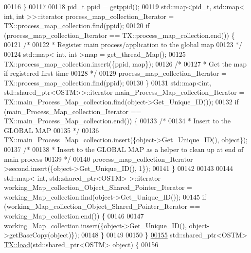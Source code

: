 \begin{DoxyCode}
00116     \}
00117     
00118     pid\_t ppid = getppid();
00119     std::map<pid\_t, std::map< int, int >>::iterator process\_map\_collection\_Iterator = 
      TX::process\_map\_collection.find(ppid);
00120     \textcolor{keywordflow}{if} (process\_map\_collection\_Iterator == TX::process\_map\_collection.end()) \{
00121         \textcolor{comment}{/*}
00122 \textcolor{comment}{         * Register main process/application to the global map}
00123 \textcolor{comment}{         */}
00124         std::map< int, int >map =  get\_thread\_Map();
00125         TX::process\_map\_collection.insert(\{ppid, map\});
00126         \textcolor{comment}{/*}
00127 \textcolor{comment}{         * Get the map if registered first time}
00128 \textcolor{comment}{         */}
00129         process\_map\_collection\_Iterator = TX::process\_map\_collection.find(ppid);
00130     \}
00131     std::map<int, std::shared\_ptr<OSTM>>::iterator main\_Process\_Map\_collection\_Iterator = 
      TX::main\_Process\_Map\_collection.find(object->Get\_Unique\_ID());
00132     \textcolor{keywordflow}{if} (main\_Process\_Map\_collection\_Iterator == TX::main\_Process\_Map\_collection.end()) \{
00133         \textcolor{comment}{/*}
00134 \textcolor{comment}{         * Insert to the GLOBAL MAP }
00135 \textcolor{comment}{         */}
00136         TX::main\_Process\_Map\_collection.insert(\{\textcolor{keywordtype}{object}->Get\_Unique\_ID(), \textcolor{keywordtype}{object}\});
00137         \textcolor{comment}{/*}
00138 \textcolor{comment}{         * Insert to the GLOBAL MAP as a helper to clean up at end of main process }
00139 \textcolor{comment}{         */}
00140         process\_map\_collection\_Iterator->second.insert(\{\textcolor{keywordtype}{object}->Get\_Unique\_ID(), 1\});
00141     \} 
00142 
00143 
00144     std::map< int, std::shared\_ptr<OSTM> >::iterator working\_Map\_collection\_Object\_Shared\_Pointer\_Iterator 
      = working\_Map\_collection.find(object->Get\_Unique\_ID());
00145     \textcolor{keywordflow}{if} (working\_Map\_collection\_Object\_Shared\_Pointer\_Iterator == working\_Map\_collection.end()) \{
00146 
00147         working\_Map\_collection.insert(\{\textcolor{keywordtype}{object}->Get\_Unique\_ID(), \textcolor{keywordtype}{object}->getBaseCopy(\textcolor{keywordtype}{object})\});
00148     \}
00149 
00150 \}
\hypertarget{_t_x_8cpp_source.tex_l00155}{}\hyperlink{class_t_x_a1d78262b8831ddd042ed491f2e600e24}{00155} std::shared\_ptr<OSTM> \hyperlink{class_t_x_a1d78262b8831ddd042ed491f2e600e24}{TX::load}(std::shared\_ptr<OSTM> \textcolor{keywordtype}{object}) \{
00156 

\end{DoxyCode}
